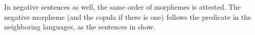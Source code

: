 \documentclass[output=paper]{langsci/langscibook}
\begin{document}
	
			
			
			
			
			
			
			
			
			
			
			
			

\noindent In negative sentences as well, the same order of morphemes is attested. The negative morpheme (and the copula if there is one) follows the predicate in the neighboring languages, as the sentences in  show.
\end{document}
